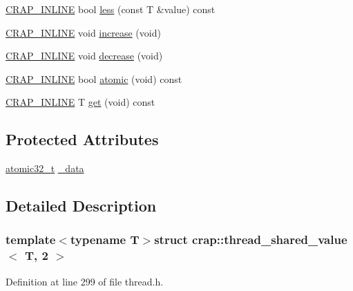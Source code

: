 \begin{DoxyCompactItemize}
\item 
\hyperlink{config__x86_8h_a5a40526b8d842e7ff731509998bb0f1c}{C\+R\+A\+P\+\_\+\+I\+N\+L\+I\+N\+E} bool \hyperlink{structcrap_1_1thread__shared__value_3_01_t_00_012_01_4_ae4f14ce439682273266779fc5ef8b643}{less} (const T \&value) const 
\item 
\hyperlink{config__x86_8h_a5a40526b8d842e7ff731509998bb0f1c}{C\+R\+A\+P\+\_\+\+I\+N\+L\+I\+N\+E} void \hyperlink{structcrap_1_1thread__shared__value_3_01_t_00_012_01_4_a373fe2f2450bbba676b6b4bd76e2332d}{increase} (void)
\item 
\hyperlink{config__x86_8h_a5a40526b8d842e7ff731509998bb0f1c}{C\+R\+A\+P\+\_\+\+I\+N\+L\+I\+N\+E} void \hyperlink{structcrap_1_1thread__shared__value_3_01_t_00_012_01_4_adf3ad64f68043b5e3aed58d8d72132c0}{decrease} (void)
\item 
\hyperlink{config__x86_8h_a5a40526b8d842e7ff731509998bb0f1c}{C\+R\+A\+P\+\_\+\+I\+N\+L\+I\+N\+E} bool \hyperlink{structcrap_1_1thread__shared__value_3_01_t_00_012_01_4_ae528e4fc829c8b029b043bd847ebc2dd}{atomic} (void) const 
\item 
\hyperlink{config__x86_8h_a5a40526b8d842e7ff731509998bb0f1c}{C\+R\+A\+P\+\_\+\+I\+N\+L\+I\+N\+E} T \hyperlink{structcrap_1_1thread__shared__value_3_01_t_00_012_01_4_a0ed95a8fd2c1e43fa4bf486f71221508}{get} (void) const 
\end{DoxyCompactItemize}
\subsection*{Protected Attributes}
\begin{DoxyCompactItemize}
\item 
\hyperlink{structcrap_1_1atomic32__t}{atomic32\+\_\+t} \hyperlink{structcrap_1_1thread__shared__value_3_01_t_00_012_01_4_a555e6a38a2755eb95a5063c2639ac4b1}{\+\_\+data}
\end{DoxyCompactItemize}


\subsection{Detailed Description}
\subsubsection*{template$<$typename T$>$struct crap\+::thread\+\_\+shared\+\_\+value$<$ T, 2 $>$}



Definition at line 299 of file thread.\+h.



